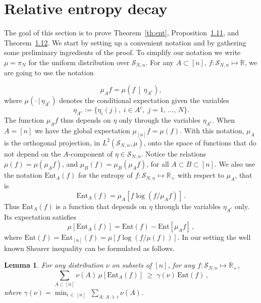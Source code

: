 \documentclass[10pt,a4paper]{amsart}
\renewcommand{\geq}{\;\geqslant\;}
\newcommand{\tc}{\, |\, }
\newcommand{\ent}{\mathrm{Ent}}
\newcommand{\cS}{\mathcal{S}}
\newcommand{\bbR}{\mathbb{R}}
\let\g=\gamma
\newtheorem{lemm}[theo]{Lemma}
\theoremstyle{definition}
\theoremstyle{plain}
\numberwithin{equation}{section}
\begin{document}
\setcounter{section}{3}
\section{Relative entropy decay}\label{sec:entdec}

The goal of this section is to prove Theorem~\ref{th:ent}, Proposition~\href{https://ahl.centre-mersenne.org/item/AHL_2024__7__1245_0/}{1.11}, and Theorem~\href{https://ahl.centre-mersenne.org/item/AHL_2024__7__1245_0/}{1.12}. We start by setting up a convenient notation and by gathering some preliminary ingredients of the proof. To simplify our notation we write $\mu=\pi_N$ for the uniform distribution over $\cS_{N,n}$. For any $A\subset [n]$, $f:\cS_{N,n}\mapsto\bbR$, we are going to use the notation

\[
\mu_A f =\mu\left(f\,\middle|\,  \eta_{A^c}\right),
\]
where $\mu(\cdot\tc \eta_{A^c})$ denotes the conditional expectation given the variables
\[
\eta_{A^c}:=\{\eta_i(j), \;i\in A^c, \;j=1,\,\dots,\,N\}.
\]
The function $\mu_Af$ thus depends on $\eta$ only through the variables $\eta_{A^c}$. When $A=[n]$ we have the global expectation $\mu_{[n]} f = \mu(f)$. With this notation, $\mu_A$ is the orthogonal projection, in $L^2(\cS_{N,n},\mu)$, onto the space of functions that do not depend on the $A$-component of $\eta\in\cS_{N,n}$.
Notice the relations $\mu(f)=\mu(\mu_A f)$, and $\mu_B(f)=\mu_B(\mu_A f)$, for all $A\subset B\subset [n]$. We also use the notation $\ent_A(f)$ for the entropy of $f:\cS_{N,n}\mapsto\bbR_+$ with respect to $\mu_A$, that is
\begin{equation}\label{entA}
\ent_A(f) = \mu_A\left[f\log(f/\mu_A f)\right]\,.
\end{equation}
Thus $\ent_A(f)$ is a function that depends on $\eta$ through the variables $\eta_{A^c}$ only. Its expectation satisfies
\begin{equation}\label{entA2}
\mu\left[\ent_A(f)\right] = \ent(f) - \ent[\mu_Af]\,,
\end{equation}
where $\ent(f) = \ent_{[n]}(f) = \mu\left[f\log(f/\mu (f))\right]$. In our setting the well known Shearer inequality can be formulated as follows.

\begin{lemm}\label{lem:shearer}
For any distribution $\nu$ on subsets of $[n]$, for any $f:\cS_{N,n}\mapsto\bbR_+$,
\begin{equation}\label{shearer}
\sum_{A\subset [n]}\nu(A) \,\mu\left[\ent_A(f)\right] \geq \g(\nu)\, \ent(f)\,,
\end{equation}
where $\g(\nu) = \min_{i\,\in\,[n]}\;\sum_{A:\,A\,\ni\,i}\nu(A)$.
\end{lemm}
\end{document}
